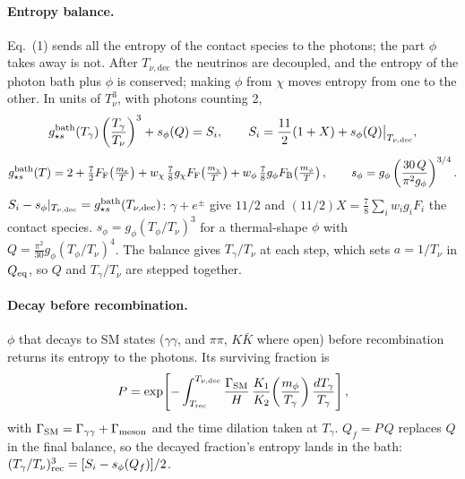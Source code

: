 \documentclass{article}
\newcommand{\Tnu}{T_{\nu,\mathrm{dec}}}
\begin{document}
\paragraph{Entropy balance.} Eq.~(1) sends all the entropy of the contact species to
the photons; the part $\phi$ takes away is not. After $\Tnu$ the neutrinos are
decoupled, and the entropy of the photon bath plus $\phi$ is conserved; making $\phi$
from $\chi$ moves entropy from one to the other. In units of $T_\nu^3$, with photons
counting 2,
\begin{equation}
  g_{\star s}^{\rm bath}(T_\gamma)\left(\frac{T_\gamma}{T_\nu}\right)^3 + s_\phi(Q) = S_i,
  \qquad S_i = \frac{11}{2}(1+X) + s_\phi(Q)\big|_{\Tnu},
\end{equation}
\begin{equation}
  g_{\star s}^{\rm bath}(T) = 2 + \tfrac72 F_{\rm F}\!\left(\tfrac{m_e}{T}\right)
    + w_\chi\,\tfrac78 g_\chi F_{\rm F}\!\left(\tfrac{m_\chi}{T}\right)
    + w_\phi\,\tfrac78 g_\phi F_{\rm B}\!\left(\tfrac{m_\phi}{T}\right),
  \qquad s_\phi = g_\phi\left(\frac{30\,Q}{\pi^2 g_\phi}\right)^{3/4}.
\end{equation}
$S_i - s_\phi|_{\Tnu} = g_{\star s}^{\rm bath}(\Tnu)$: $\gamma+e^\pm$ give $11/2$ and
$(11/2)X = \tfrac78\sum_i w_i g_i F_i$ the contact species. $s_\phi = g_\phi
(T_\phi/T_\nu)^3$ for a thermal-shape $\phi$ with $Q = \tfrac{\pi^2}{30} g_\phi
(T_\phi/T_\nu)^4$. The balance gives $T_\gamma/T_\nu$ at each step, which sets
$a = 1/T_\nu$ in $Q_{\rm eq}$, so $Q$ and $T_\gamma/T_\nu$ are stepped together.

\paragraph{Decay before recombination.} $\phi$ that decays to SM states
($\gamma\gamma$, and $\pi\pi$, $K\bar K$ where open) before recombination returns
its entropy to the photons. Its surviving fraction is
\begin{equation}
  P = \exp\!\left[-\int_{T_{\rm rec}}^{\Tnu} \frac{\Gamma_{\rm SM}}{H}\,
      \frac{K_1}{K_2}\!\left(\frac{m_\phi}{T_\gamma}\right)\frac{dT_\gamma}{T_\gamma}\right],
\end{equation}
with $\Gamma_{\rm SM}=\Gamma_{\gamma\gamma}+\Gamma_{\rm meson}$ and the time dilation taken at $T_\gamma$. $Q_f = P\,Q$ replaces $Q$ in the final
balance, so the decayed fraction's entropy lands in the bath:
$(T_\gamma/T_\nu)^3_{\rm rec} = [S_i - s_\phi(Q_f)]/2$.
\end{document}

